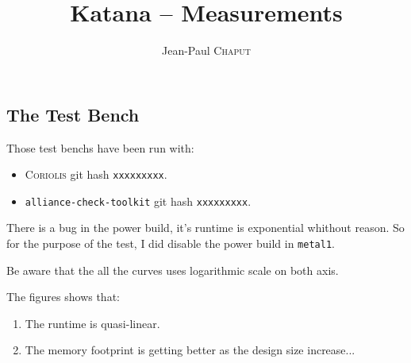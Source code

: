 \documentclass[11pt]{article}
\newcommand {\Chaput} {\textsc{Chaput}\xspace}
\begin{document}
   

   \title{Katana -- Measurements}
   \author{Jean-Paul \Chaput}

   \maketitle

   \thispagestyle{fancy}

   \subsection*{The Test Bench}

   Those test benchs have been run with:
   \begin{itemize}
      \item \textsc{Coriolis}\xspace                git hash \texttt{xxxxxxxxx}.
      \item \texttt{alliance-check-toolkit}\xspace  git hash \texttt{xxxxxxxxx}.
   \end{itemize}

   There is a bug in the power build, it's runtime is exponential whithout
   reason. So for the purpose of the test, I did disable the power build
   in \texttt{metal1}.

   Be aware that the all the curves uses logarithmic scale on both axis.

   The figures shows that:
   \begin{enumerate}
     \item The runtime is quasi-linear.
     \item The memory footprint is getting better as the design size
           increase...
   \end{enumerate}


   \begin{center}
   \end{center}
   \begin{center}
   \end{center}


%  
%      
\end{document}
